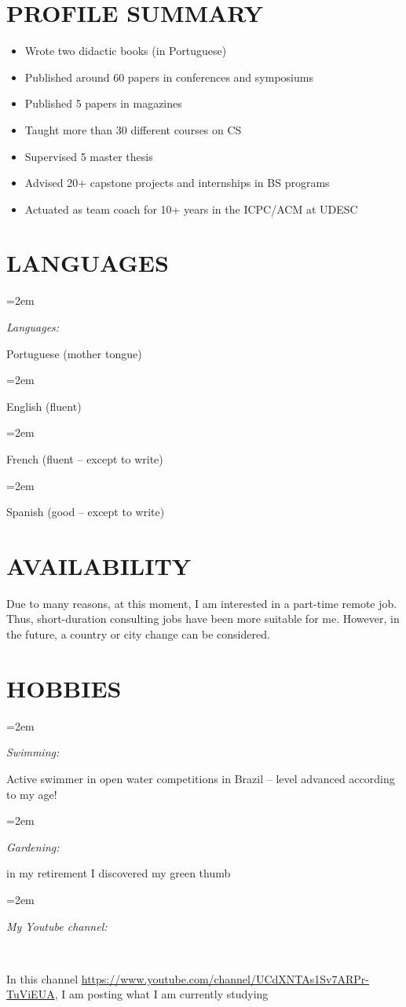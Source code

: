 \documentclass[paper=a4,fontsize=11pt]{scrartcl} %
\newlength{\spacebox}
\newcommand{\sepspace}{\vspace*{0.8em}}		%
\newcommand{\NewPart}[1]{\section*{\uppercase{#1}}}
\newcommand{\PersonalEntry}[2]{
		\noindent\hangindent=2em\hangafter=0 %
		\parbox{\spacebox}{        %
		\textit{#1}}		       %
		\hspace{1.5em} #2 \par}    %
\newcommand{\SkillsEntry}[2]{      %
		\noindent\hangindent=2em\hangafter=0 %
		\parbox{\spacebox}{        %
		\textit{#1}}			   %
		\hspace{1.5em} #2 \par}    %
\begin{document}
\NewPart{Profile Summary}{} %

\begin{itemize}
\setlength\itemsep{-2mm}
\item Wrote two didactic books  (in Portuguese)
\item Published around 60 papers in conferences and symposiums
\item Published 5 papers in magazines
\item Taught more than 30 different courses on CS 
\item Supervised 5 master thesis 
\item Advised  20+ capstone projects and internships in BS programs
\item Actuated as team coach for 10+ years in the ICPC/ACM at UDESC

\end{itemize}

\NewPart{Languages}{}

\SkillsEntry{Languages:} {Portuguese (mother tongue)}
\SkillsEntry{}{English (fluent)}
\SkillsEntry{}{French (fluent -- except to write)}
\SkillsEntry{}{Spanish (good -- except to write)}


\NewPart{Availability}{}

Due to many reasons, at this moment, I am interested in a part-time remote job. Thus,  short-duration consulting jobs  have been more suitable for me. However, in the future, a country or city change can be considered.

\NewPart{Hobbies}{}

\SkillsEntry{Swimming:}{Active swimmer in open water competitions in Brazil -- level advanced according to my age!}
\sepspace

\SkillsEntry{Gardening:}{in my retirement I discovered my green thumb}
\sepspace

\SkillsEntry{My Youtube channel:} \\
{In this channel \url{https://www.youtube.com/channel/UCdXNTAs1Sv7ARPr-TuViEUA},
 I am posting what I am currently studying}
\end{document}
